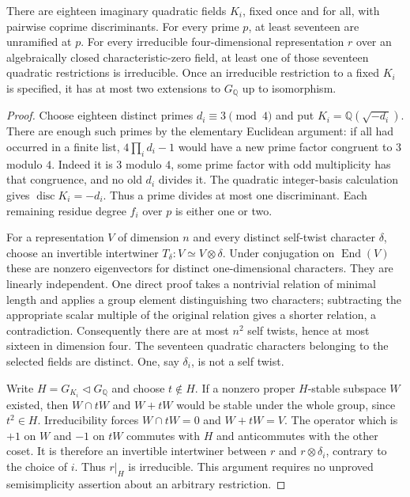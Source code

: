 \begin{proposition}
\label{claim:CX6}
There are eighteen imaginary quadratic fields $K_i$, fixed
once and for all, with pairwise coprime discriminants.
For every prime $p$, at least seventeen are unramified at $p$.
For every irreducible four-dimensional representation $r$
over an algebraically closed characteristic-zero field, at
least one of those seventeen quadratic restrictions is
irreducible.  Once an irreducible restriction to a fixed
$K_i$ is specified, it has at most two extensions to
$G_{\mathbb Q}$ up to isomorphism.
\end{proposition}

\begin{proof}
Choose eighteen distinct primes $d_i\equiv3\pmod4$ and put
$K_i=\mathbb Q(\sqrt{-d_i})$.  There are enough such primes
by the elementary Euclidean argument: if all had occurred
in a finite list, $4\prod_i d_i-1$ would have a new prime
factor congruent to $3$ modulo $4$.  Indeed it is $3$ modulo
$4$, some prime factor with odd multiplicity has that
congruence, and no old $d_i$ divides it.  The quadratic
integer-basis calculation gives
$\operatorname{disc}K_i=-d_i$.  Thus a prime divides at
most one discriminant.  Each remaining residue degree
$f_i$ over $p$ is either one or two.

For a representation $V$ of dimension $n$ and every distinct
self-twist character $\delta$, choose an invertible
intertwiner $T_\delta:V\simeq V\otimes\delta$.
Under conjugation on $\operatorname{End}(V)$ these are
nonzero eigenvectors for distinct one-dimensional
characters.  They are linearly independent.  One direct
proof takes a nontrivial relation of minimal length and
applies a group element distinguishing two characters;
subtracting the appropriate scalar multiple of the
original relation gives a shorter relation, a contradiction.
Consequently there are at most $n^2$ self twists, hence at
most sixteen in dimension four.  The seventeen quadratic
characters belonging to the selected fields are distinct.
One, say $\delta_i$, is not a self twist.

Write $H=G_{K_i}\triangleleft G_{\mathbb Q}$ and choose
$t\notin H$.  If a nonzero proper $H$-stable subspace $W$
existed, then $W\cap tW$ and $W+tW$ would be stable under
the whole group, since $t^2\in H$.  Irreducibility forces
$W\cap tW=0$ and $W+tW=V$.  The operator which is $+1$
on $W$ and $-1$ on $tW$ commutes with $H$ and anticommutes
with the other coset.  It is therefore an invertible
intertwiner between $r$ and $r\otimes\delta_i$, contrary
to the choice of $i$.  Thus $r|_H$ is irreducible.  This
argument requires no unproved semisimplicity assertion
about an arbitrary restriction.


\end{proof}
